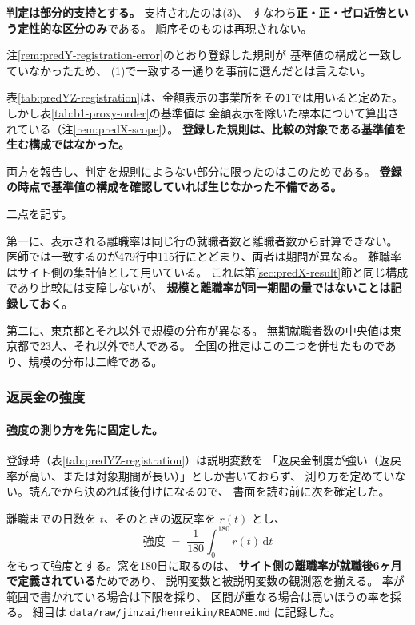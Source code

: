 \textbf{判定は部分的支持とする。} 支持されたのは(3)、
すなわち\textbf{正・正・ゼロ近傍という定性的な区分のみ}である。
順序そのものは再現されない。

注\ref{rem:predY-registration-error}のとおり登録した規則が
基準値の構成と一致していなかったため、
(1)で一致する一通りを事前に選んだとは言えない。

\begin{remark}[登録した除外規則が基準値の構成と一致していなかった]
\label{rem:predY-registration-error}
表\ref{tab:predYZ-registration}は、金額表示の事業所をその1では用いると定めた。
しかし表\ref{tab:b1-proxy-order}の基準値は
金額表示を除いた標本について算出されている（注\ref{rem:predX-scope}）。
\textbf{登録した規則は、比較の対象である基準値を生む構成ではなかった。}

両方を報告し、判定を規則によらない部分に限ったのはこのためである。
\textbf{登録の時点で基準値の構成を確認していれば生じなかった不備である。}
\end{remark}

\begin{remark}[標本の限界]
\label{rem:predY-limits}
二点を記す。

第一に、表示される離職率は同じ行の就職者数と離職者数から計算できない。
医師では一致するのが479行中115行にとどまり、両者は期間が異なる。
離職率はサイト側の集計値として用いている。
これは第\ref{sec:predX-result}節と同じ構成であり比較には支障しないが、
\textbf{規模と離職率が同一期間の量ではないことは記録しておく}。

第二に、東京都とそれ以外で規模の分布が異なる。
無期就職者数の中央値は東京都で23人、それ以外で5人である。
全国の推定はこの二つを併せたものであり、規模の分布は二峰である。
\end{remark}


\subsubsection{返戻金の強度}
\label{sec:predZ-result}

\paragraph{強度の測り方を先に固定した。}

登録時（表\ref{tab:predYZ-registration}）は説明変数を
「返戻金制度が強い（返戻率が高い、または対象期間が長い）」としか書いておらず、
測り方を定めていない。読んでから決めれば後付けになるので、
書面を読む前に次を確定した。

離職までの日数を $t$、そのときの返戻率を $r(t)$ とし、
\begin{equation}
\text{強度} \;=\; \frac{1}{180}\int_{0}^{180} r(t)\,\mathrm{d}t
\label{eq:henreikin-strength}
\end{equation}
をもって強度とする。窓を180日に取るのは、
\textbf{サイト側の離職率が就職後6ヶ月で定義されている}ためであり、
説明変数と被説明変数の観測窓を揃える。
率が範囲で書かれている場合は下限を採り、
区間が重なる場合は高いほうの率を採る。
細目は \texttt{data/raw/jinzai/henreikin/README.md} に記録した。

